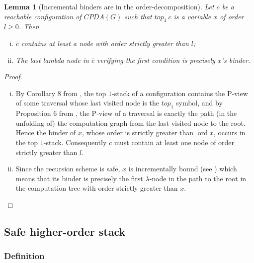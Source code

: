 \documentclass{article}
\newcommand{\ord}{\mathop{\mathrm{ord}}}
\newtheorem{lemma}{Lemma}[section]
\theoremstyle{remark}
\theoremstyle{definition}
\newcommand\orddec\overline
\begin{document}
\begin{lemma}[Incremental binders are in the order-decomposition]
\label{lem:binder_in_ordecompos} Let $c$ be a reachable
configuration of $CPDA(G)$ such that $top_1\
c$ is a variable $x$ of order $l\geq 0$. Then
\begin{enumerate}[i.]
\item $\orddec{c}$ contains at least a node with order strictly
greater than $l$;
\item The last lambda node in $\orddec{c}$ verifying the first condition is precisely $x$'s binder.
\end{enumerate}
\end{lemma}
\begin{proof}
\begin{enumerate}[i.]
\item By Corollary 8 from \cite{hague-sto07}, the top $1$-stack of a configuration contains the P-view of some
    traversal whose last visited node is the $top_1$ symbol, and
    by Proposition 6 from \cite{OngLics2006}, the P-view of a
    traversal is exactly the path (in the unfolding of) the
    computation graph from the last visited node to
    the root. Hence the binder of $x$, whose order
    is strictly greater than $\ord{x}$, occurs in the top $1$-stack.
    Consequently $\orddec{c}$ must contain at least one node of order strictly greater than $l$.

\item Since the recursion scheme is safe, $x$ is
 incrementally bound (see \cite{blumong:safelambdacalculus})
 which means that its binder is precisely the first $\lambda$-node in the
 path to the root in the computation tree with order strictly
 greater than $x$.
\end{enumerate}
\end{proof}

\subsection{Safe higher-order stack}
\subsubsection{Definition}
\end{document}
